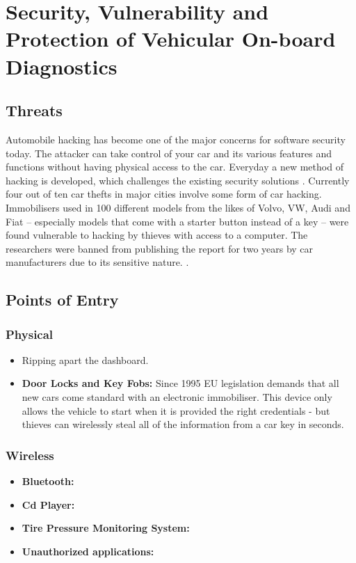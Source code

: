 \documentclass[11pt]{article}
\begin{document}
\section{Security, Vulnerability and Protection of Vehicular On-board Diagnostics}

\subsection{Threats}

Automobile hacking has become one of the major concerns for software security today. The attacker can take control of your car and its various features and functions without having physical access to the car. Everyday a new method of hacking is developed, which challenges the existing security solutions \cite{Yadav16}. Currently four out of ten car thefts in major cities involve some form of car hacking. Immobilisers used in 100 different models from the likes of Volvo, VW, Audi and Fiat – especially models that come with a starter button instead of a key – were found vulnerable to hacking by thieves with access to a computer. The researchers were banned from publishing the report for two years by car manufacturers due to its sensitive nature. \cite{Saarinen}.

\subsection{Points of Entry}

\subsubsection{Physical}

\begin{itemize}
	\item Ripping apart the dashboard.
	\item \textbf{Door Locks and Key Fobs:} Since 1995 EU legislation demands that all new cars come standard with an electronic immobiliser. This device only allows the vehicle to start when it is provided the right credentials - but thieves can wirelessly steal all of the information from a car key in seconds. \cite{Yadav16}
\end{itemize}

\subsubsection{Wireless}

\begin{itemize}
	\item \textbf{Bluetooth:}
	\item \textbf{Cd Player:}
	\item \textbf{Tire Pressure Monitoring System:}
	\item \textbf{Unauthorized applications:}
\end{itemize}
\end{document}
